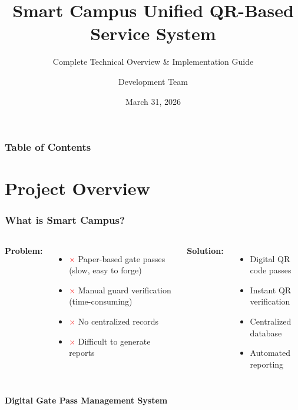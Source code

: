 \documentclass[11pt]{beamer}
\title{Smart Campus Unified QR-Based Service System}
\subtitle{Complete Technical Overview \& Implementation Guide}
\author{Development Team}
\date{March 31, 2026}
\institute{Smart Campus Project}
\begin{document}
\frame{\titlepage}

\begin{frame}
\frametitle{Table of Contents}
\tableofcontents
\end{frame}

\section{Project Overview}

\begin{frame}
\frametitle{What is Smart Campus?}
\begin{columns}[T]
\textbf{Problem:}
\begin{itemize}
    \item \textcolor{red}{\(\times\)} Paper-based gate passes (slow, easy to forge)
    \item \textcolor{red}{\(\times\)} Manual guard verification (time-consuming)
    \item \textcolor{red}{\(\times\)} No centralized records
    \item \textcolor{red}{\(\times\)} Difficult to generate reports
\end{itemize}

\textbf{Solution:}
\begin{itemize}
    \item \textcolor{darkgreen}{\checkmark} Digital QR code passes
    \item \textcolor{darkgreen}{\checkmark} Instant QR verification
    \item \textcolor{darkgreen}{\checkmark} Centralized database
    \item \textcolor{darkgreen}{\checkmark} Automated reporting
\end{itemize}
\end{columns}

\vspace{1cm}
\begin{center}
\textbf{\Large Digital Gate Pass Management System}
\end{center}
\end{frame}
\end{document}
